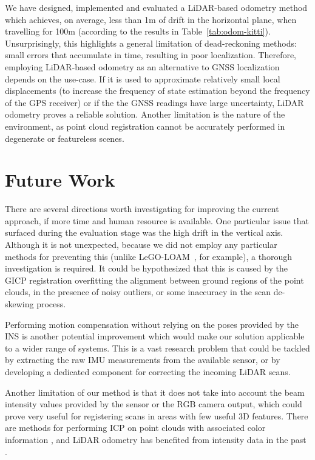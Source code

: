 \begin{compactenum}
    We have designed, implemented and evaluated a LiDAR-based odometry method which achieves, on average, less than 1m of drift in the horizontal plane, when travelling for 100m (according to the results in Table~\ref{tab:odom-kitti}). Unsurprisingly, this highlights a general limitation of dead-reckoning methods: small errors that accumulate in time, resulting in poor localization. Therefore, employing LiDAR-based odometry as an alternative to GNSS localization depends on the use-case. If it is used to approximate relatively small local displacements (\eg to increase the frequency of state estimation beyond the frequency of the GPS receiver) or if the the GNSS readings have large uncertainty, LiDAR odometry proves a reliable solution. Another limitation is the nature of the environment, as point cloud registration cannot be accurately performed in degenerate or featureless scenes.

\end{compactenum}


\section{Future Work}

There are several directions worth investigating for improving the current approach, if more time and human resource is available. One particular issue that surfaced during the evaluation stage was the high drift in the vertical axis. Although it is not unexpected, because we did not employ any particular methods for preventing this (unlike \mbox{LeGO-LOAM \cite{legoloam2018}}, for example), a thorough investigation is required. It could be hypothesized that this is caused by the GICP registration overfitting the alignment between ground regions of the point clouds, in the presence of noisy outliers, or some inaccuracy in the scan de-skewing process.

Performing motion compensation without relying on the poses provided by the INS is another potential improvement which would make our solution applicable to a wider range of systems. This is a vast research problem that could be tackled by extracting the raw IMU measurements from the available sensor, or by developing a dedicated component for correcting the incoming LiDAR scans.

Another limitation of our method is that it does not take into account the beam intensity values provided by the sensor or the RGB camera output, which could prove very useful for registering scans in areas with few useful 3D features. There are methods for performing ICP on point clouds with associated color information \cite{park2017colored}, and LiDAR odometry has benefited from intensity data in the past \cite{pfreundschuh2024coin}.

